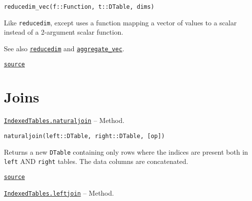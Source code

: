 \documentclass{memoir}
\begin{document}
\begin{adjustwidth}{2em}{0pt}


\begin{lstlisting}
reducedim_vec(f::Function, t::DTable, dims)
\end{lstlisting}

Like \texttt{reducedim}, except uses a function mapping a vector of values to a scalar instead of a 2-argument scalar function.

See also \href{apireference.html\#Base.reducedim-Tuple\{Any,JuliaDB.DTable,Any\}}{\texttt{reducedim}} and \href{apireference.html\#IndexedTables.aggregate\_vec-Tuple\{Any,JuliaDB.DTable\}}{\texttt{aggregate\_vec}}.



\href{https://github.com/JuliaComputing/JuliaDB.jl/tree/9e65f8c3b0e9c2e27c3334a093a5aefc6c7d1246/src/query.jl#L153-L159}{\texttt{source}}


\end{adjustwidth}

\hypertarget{17547467198752541145}{}


\section{Joins}


\hypertarget{12660523155664088029}{} 
\hyperlink{12660523155664088029}{\texttt{IndexedTables.naturaljoin}}  -- {Method.}

\begin{adjustwidth}{2em}{0pt}


\begin{lstlisting}
naturaljoin(left::DTable, right::DTable, [op])
\end{lstlisting}

Returns a new \texttt{DTable} containing only rows where the indices are present both in \texttt{left} AND \texttt{right} tables. The data columns are concatenated.



\href{https://github.com/JuliaComputing/JuliaDB.jl/tree/9e65f8c3b0e9c2e27c3334a093a5aefc6c7d1246/src/join.jl#L5-L10}{\texttt{source}}


\end{adjustwidth}
\hypertarget{16288860316829423119}{} 
\hyperlink{16288860316829423119}{\texttt{IndexedTables.leftjoin}}  -- {Method.}
\end{document}

